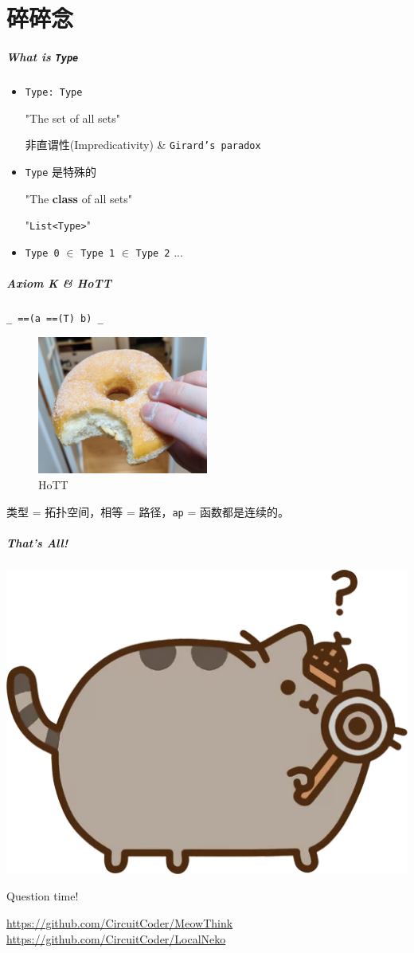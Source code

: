 \documentclass[UTF-8]{ctexbeamer}
\begin{document}
\part{碎碎念}
\frame{\partpage}

\begin{frame}
  \frametitle{What is \texttt{Type}}

  \pause
  \begin{itemize}
    \item \texttt{Type: Type}

    \pause
    "The set of all sets"

    \pause
    非直谓性(Impredicativity) \& \texttt{Girard's paradox}

    \item \texttt{Type} 是特殊的

    "The \textbf{class} of all sets"

    \pause
    "\texttt{List<Type>}"

    \pause
    \item \texttt{Type 0} $\in$ \texttt{Type 1} $\in$ \texttt{Type 2} ...



  \end{itemize}
\end{frame}

\begin{frame}
  \frametitle{Axiom K \& HoTT}
  \texttt{\_ ==(a ==(T) b) \_}

  \pause

  \begin{figure}
    \includegraphics[width=0.5\textwidth]{assets/real.jpg}
    \caption{HoTT}
  \end{figure}
  类型 = 拓扑空间，相等 = 路径，\texttt{ap} = 函数都是连续的。
\end{frame}

\begin{frame}
  \frametitle{That's All!}
  \begin{center}
    \includegraphics[width=.5\textwidth]{assets/look.png}

    Question time!
  \end{center}
  \url{https://github.com/CircuitCoder/MeowThink}
  \url{https://github.com/CircuitCoder/LocalNeko}
\end{frame}
\end{document}
